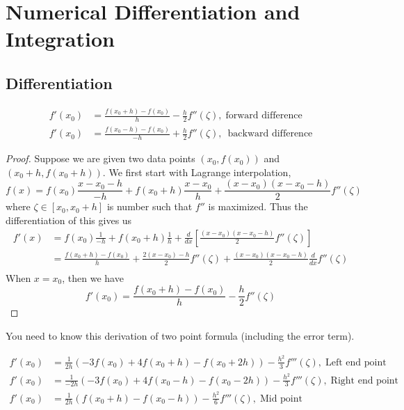\chapter{Numerical Differentiation and Integration}
\section{Differentiation}

\begin{thm} 
	\begin{align*}
	f'(x_0) &= \frac{f(x_0 + h) - f(x_0)}{h} - \frac{h}{2} f''(\zeta),\;\text{forward difference} \\
	f'(x_0) &= \frac{f(x_0 - h) - f(x_0)}{-h} + \frac{h}{2} f''(\zeta),\;\ \text{backward difference}
	\end{align*}
\end{thm}
\begin{proof}
	Suppose we are given two data points $(x_0,f(x_0))$ and $(x_0+h,f(x_0+h))$. We first start with Lagrange interpolation,
	\[ f(x) = f(x_0)\frac{x-x_0-h}{-h} + f(x_0+h)\frac{x-x_0}{h} + \frac{(x-x_0)(x-x_0-h)}{2}f''(\zeta) \]
	where $\zeta\in[x_0,x_0+h]$ is number such that $f''$ is maximized. Thus the differentiation of this gives us
	\begin{align*}
	f'(x) &= f(x_0)\frac{1}{-h} + f(x_0+h)\frac{1}{h} + \frac{d}{dx}\left[ \frac{(x-x_0)(x-x_0-h)}{2}f''(\zeta) \right]\\
	&= \frac{f(x_0+h)-f(x_0)}{h} + \frac{2(x-x_0)-h}{2}f''(\zeta) + \frac{(x-x_0)(x-x_0-h)}{2}\frac{d}{dx}f''(\zeta)\\
	\end{align*}
	When $x=x_0$, then we have
	\[ f'(x_0) = \frac{f(x_0+h)-f(x_0)}{h} - \frac{h}{2}f''(\zeta)\]
\end{proof}

You need to know this derivation of two point formula (including the error term).

\begin{thm} 
	\begin{align*}
	f'(x_0) &= \frac{1}{2h} (-3f(x_0) + 4f(x_0+h) - f(x_0+2h))  - \frac{h^2}{3}f'''(\zeta), \; \text{Left end point}\\
	f'(x_0) &= \frac{1}{-2h} (-3f(x_0) + 4f(x_0-h) - f(x_0-2h))  - \frac{h^2}{3}f'''(\zeta), \; \text{Right end point}\\
	f'(x_0) &= \frac{1}{2h} (f(x_0+h) - f(x_0-h))  - \frac{h^2}{6}f'''(\zeta), \; \text{Mid point}
	\end{align*}
	
\end{thm}


